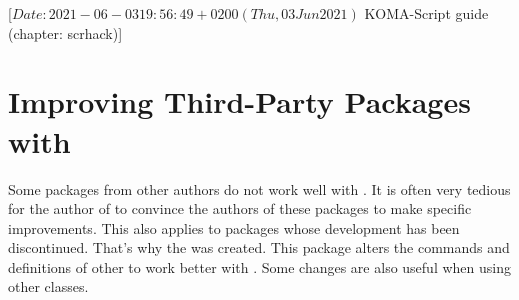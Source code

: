 %
%
%
%
%
%
%
%
% 
%
%
%
%

                 [$Date: 2021-06-03 19:56:49 +0200 (Thu, 03 Jun 2021) $
                  KOMA-Script guide (chapter: scrhack)]


\chapter{Improving Third-Party Packages with }

\BeginIndexGroup
{}
Some packages from other authors do not work well with \KOMAScript{}. It is
often very tedious for the author of \KOMAScript{} to convince the authors of
these packages to make specific improvements. This also applies to packages
whose development has been discontinued. That's why the  was
created. This package alters the commands and definitions of other to work
better with \KOMAScript{}. Some changes are also useful when using other
classes.

